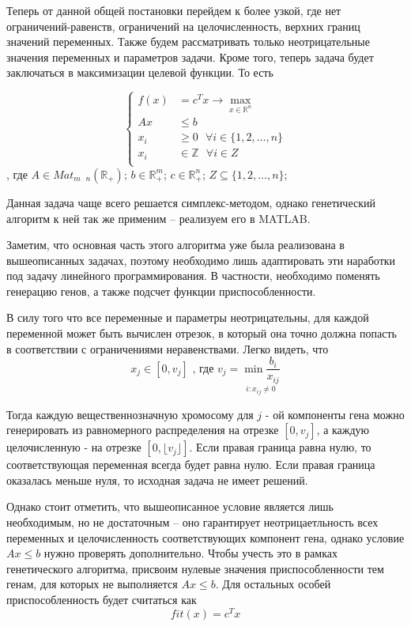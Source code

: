 \documentclass[../main.tex]{subfiles}
\begin{document}
 	Теперь от данной общей постановки перейдем к более узкой, где нет ограничений-равенств, ограничений на целочисленность, верхних границ значений переменных. Также будем рассматривать только неотрицательные значения переменных и параметров задачи. Кроме того, теперь задача будет заключаться в максимизации целевой функции. То есть
 	
 	\[\left\{\begin{aligned}
 		f(x) &= c^T x \rightarrow \underset{x \in \mathbb{R}^n}{\max} \\ 
 		Ax &\leqslant b \\
		x_i &\geqslant 0  \text{ } \forall i \in  \{1, 2, \dots, n\} \\
 		x_i &\in \mathbb{Z}  \text{ }  \forall i \in Z\\
 	\end{aligned}\right.\]
 	, где $A \in Mat_{m \text{ } n}(\mathbb{R}_+)$; $b \in \mathbb{R}_+^m$; $c \in \mathbb{R}_+^n$; $Z \subseteq \{1, 2, \dots, n\}$;
 	
 	Данная задача чаще всего решается симплекс-методом, однако генетический алгоритм к ней так же применим -- реализуем его в MATLAB.
 	
 	Заметим, что основная часть этого алгоритма уже была реализована в вышеописанных задачах, поэтому необходимо лишь адаптировать эти наработки под задачу линейного программирования. В частности, необходимо поменять генерацию генов, а также подсчет функции приспособленности.
 	
 	В силу того что все переменные и параметры неотрицательны, для каждой переменной может быть вычислен отрезок, в который она точно должна попасть в соответствии с ограничениями неравенствами. Легко видеть, что
 	 \[x_j \in [0, v_j] \text{ , где } v_j = \underset{i: x_{ij} \neq 0}{\min{\frac{b_i}{x_{ij}}}} \]
 	 
 	 Тогда каждую вещественнозначную хромосому для $j$ - ой компоненты гена можно генерировать из равномерного распределения на отрезке $[0, v_j]$, а каждую целочисленную - на отрезке $[0, \lfloor v_j \rfloor]$. Если правая граница равна нулю, то соответствующая переменная всегда будет равна нулю. Если правая граница оказалась меньше нуля, то исходная задача не имеет решений.
 	 
 	 Однако стоит отметить, что вышеописанное условие является лишь необходимым, но не достаточным -- оно гарантирует неотрицаетльность всех переменных и целочисленность соответствующих компонент гена, однако условие $Ax\leqslant b$ нужно проверять дополнительно. Чтобы учесть это в рамках генетического алгоритма, присвоим нулевые значения приспособленности тем генам, для которых не выполняется $Ax \leqslant b$. Для остальных особей приспособленность будет считаться как
 	 \[fit(x) = c^T x\] 
 	 
\end{document}
